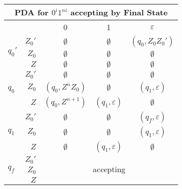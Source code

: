 \begin{center}\begin{tabular}{l r c c c}
    \multicolumn{5}{c}{PDA for \(0^i 1^{ni}\) accepting by Final State}\\\bottomrule
    & & 0 & 1 & \(\varepsilon \) \\\cmidrule{3-5}
    \multirow{3}{*}{\(q_0'\)} & \(Z_0'\) & \(\emptyset \) & \(\emptyset \) & \((q_0, Z_0 Z_0')\) \\
    & \(Z_0\) & \(\emptyset \) & \(\emptyset \) & \(\emptyset \) \\
    & \(Z\) & \(\emptyset \) & \(\emptyset \) & \(\emptyset \) \\\midrule
    \multirow{3}{*}{\(q_0\)}  & \(Z_0'\) & \(\emptyset \) & \(\emptyset \) & \(\emptyset \) \\
    & \(Z_0\) & \((q_0, Z^n Z_0)\) & \(\emptyset \) & \((q_1, \varepsilon) \) \\
    & \(Z\) & \((q_0, Z^{n+1})\)  & \((q_1, \varepsilon) \) & \(\emptyset \) \\\midrule
    \multirow{3}{*}{\(q_1\)} & \(Z_0'\) & \(\emptyset \) & \(\emptyset \) & \((q_f, \varepsilon)\) \\
    & \(Z_0\) & \(\emptyset \) & \(\emptyset \) & \((q_1, \varepsilon)\) \\
    & \(Z\) & \(\emptyset \) & \((q_1, \varepsilon)\) & \(\emptyset \) \\\midrule
    \multirow{3}{*}{\(q_f\)} & \(Z_0'\) &\multicolumn{3}{c}{\multirow{3}{*}{accepting}} \\
    & \(Z_0\) \\
    & \(Z\)
\end{tabular}\end{center}

